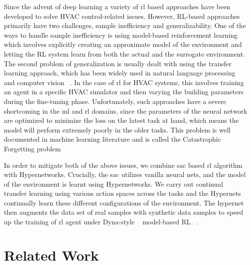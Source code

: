 \documentclass{article}
\begin{document}
Since the advent of deep learning a variety of \gls{rl} based approaches have been developed to solve HVAC control-related issues. However, RL-based approaches primarily have two challenges, sample inefficiency and generalizability. 
One of the ways to handle sample inefficiency is using model-based reinforcement learning ~\cite{Janner} which involves explicitly creating an approximate model of the environment and letting the RL system learn from both the actual and the surrogate environment. The second problem of generalization is usually dealt with using the transfer learning approach, which has been widely used in natural language processing and computer vision ~\cite{Zhuang}.
In the case of \gls{rl} for HVAC systems, this involves training an agent in a specific HVAC simulator and then varying the building parameters during the fine-tuning phase.
Unfortunately, such approaches have a severe shortcoming in the \gls{ml}  and \gls{rl} domains, since the parameters of the neural network are optimized to minimize the loss on the latest task at hand, which means the model will perform extremely poorly in the older tasks.
This problem is well documented in machine learning literature and is called the Catastrophic Forgetting problem ~\cite{Luo}

In order to mitigate both of the above issues, we combine \gls{sac} based \gls{rl} algorithm with Hypernetworks. Crucially, the \gls{sac} utilizes vanilla neural nets, and the model of the environment is learnt using Hypernetworks.
We carry out continual transfer learning using various action spaces across the tasks and the Hypernets continually learn these different configurations of the environment.
The hypernet then augments the data set of real samples with synthetic data samples to speed up the training of \gls{rl} agent under Dyna-style ~\cite{Sutton} model-based RL
~\cite{Moerland}.




\section {Related Work}
\end{document}
